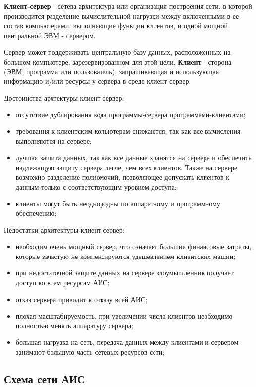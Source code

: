 \documentclass[russian,utf8,emptystyle]{eskdtext}
\begin{document}
\textbf{Клиент-сервер} - сетева архитектура или организация построения сети, в которой производится разделение вычислительной нагрузки между включенными в ее состав компьютерами, выполняющие функции клиентов, и одной мощной центральной ЭВМ - сервером.

Сервер может поддерживать центральную базу данных, расположенных на большом компьютере, зарезервированном для этой цели. \textbf{Клиент} - сторона (ЭВМ, программа или пользователь), запрашивающая и использующая информацию и/или ресурсы у сервера в среде клиент-сервер.

Достоинства архтектуры клиент-сервер:
\begin{itemize}[label=-]
\item отсутствие дублирования кода программы-сервера программами-клиентами;
\item требования к клиентским копьютерам снижаются, так как все вычисления выполняются на сервере;
\item лучшая защита данных, так как все данные хранятся на сервере и обеспечить надлежащую защиту сервера легче, чем всех клиентов. Также на сервере возможно разделение полномочий, позволяющее допускать клиентов к данным только с соответствующим уровнем доступа;
\item клиенты могут быть неоднородны по аппаратному и программному обеспечению;
\end{itemize}

Недостатки архитектуры клиент-сервер:
\begin{itemize}[label=-]
\item необходим очень мощный сервер, что означает большие финансовые затраты, которые зачастую не компенсируются удешевлением клиентских машин;
\item при недостаточной защите данных на сервере злоумышленник получает доступ ко всем ресурсам АИС;
\item отказ сервера приводит к отказу всей АИС;
\item плохая масштабируемость, при увеличении числа клиентов необходимо полностью менять аппаратуру сервера;
\item большая нагрузка на сеть, передача данных между клиентами и сервером занимают большую часть сетевых ресурсов сети;
\end{itemize}

\subsection{Схема сети АИС}
\end{document}
